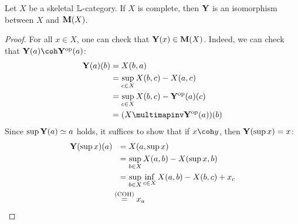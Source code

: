 \begin{proposition}
Let $X$ be a skeletal $\mathbb{L}$-category. 
If $X$ is complete, then $\mathbf{Y}$ is an isomorphism between $X$ and $\mathbf{M}(X)$. 
\end{proposition}
\begin{proof}
For all $x\in X$, one can check that $\mathbf{Y}(x)\in \mathbf{M}(X)$. Indeed, we can check that $\B Y(a) \coh \B Y^{\mathrm{op}}(a)$:
\begin{align*}
\B Y(a)(b)  &= X(b,a) \\
&=  \sup_{c\in X}X(b,c  )- X(a,c)\\
&= \sup_{c\in X}X(b,c  )- \B Y^{\mathrm{op}}(a)(c)\\
 &= (X\multimapinv \B Y^{\mathrm{op}}(a))(b)
\end{align*}
Since $\sup\mathbf{Y}(a) \simeq a$ holds, it suffices to show that if $x \coh  y$, then 
$\mathbf{Y}(\sup x)=x$: 
\begin{align*}
\B Y(\sup x)(a) & \ \ = X(a, \sup x) \\
&\ \ = \sup_{b\in X}X(a,b)-X(\sup x, b) \\
&\ \ = \sup_{b\in X}\inf_{c\in X}X(a,b)- X(b,c) + x_{c} \\
 &\stackrel{{\tiny\text{(COH)}}}{=} x_{a}
\end{align*}
\end{proof}


